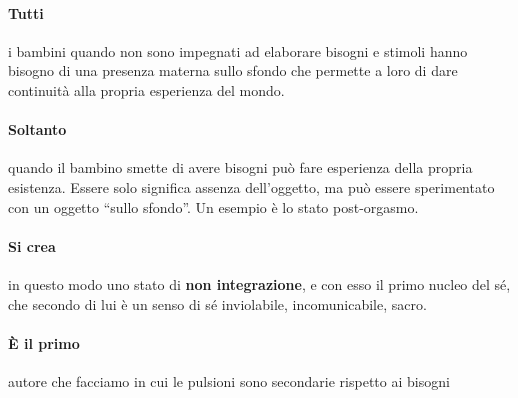 \documentclass[12pt, a4paper]{article}
\begin{document}
\paragraph{Tutti} i bambini quando non sono impegnati ad elaborare bisogni e stimoli hanno bisogno di una presenza materna sullo sfondo che permette a loro di dare continuit\`a alla propria esperienza del mondo.

\paragraph{Soltanto} quando il bambino smette di avere bisogni può fare esperienza della propria esistenza.
Essere solo significa assenza dell'oggetto, ma può essere sperimentato con un oggetto ``sullo sfondo''. Un esempio \`e lo stato post-orgasmo.

\paragraph{Si crea} in questo modo uno stato di \textbf{non integrazione}, e con esso il primo nucleo del s\'e, che secondo di lui \`e un senso di s\'e inviolabile, incomunicabile, sacro.

\paragraph{\`E il primo} autore che facciamo in cui le pulsioni sono secondarie rispetto ai bisogni
\end{document}
